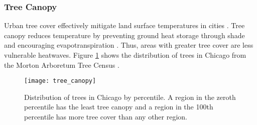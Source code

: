 \subsubsection{Tree Canopy}

Urban tree cover effectively mitigate land surface temperatures in cities
\cite{loughner_roles_2012, schwaab_role_2021, mcdonald_tree_2021}. Tree canopy
reduces temperature by preventing ground heat storage through shade and encouraging
evapotranspiration \cite{mcdonald_tree_2021}. Thus, areas with greater tree cover
are less vulnerable heatwaves. Figure \ref{fig:tree_census} shows the distribution
of trees in Chicago from the Morton Arboretum Tree Census \cite{kua_chicago_2020}.

\begin{figure}[H]
  \label{fig:tree_census}
    \begin{center}
      \texttt{[image: tree\_canopy]}
      \vspace*{-2cm}
      \caption{Distribution of trees in Chicago by percentile. A region in the zeroth
      percentile has the least tree canopy and a region in the 100th percentile has
      more tree cover than any other region.}
    \end{center}
\end{figure}
